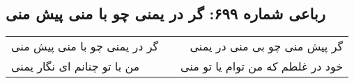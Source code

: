 \begin{center}
\section*{رباعی شماره ۶۹۹: گر در یمنی چو با منی پیش منی}
\label{sec:sh699}
\begin{longtable}{l p{0.5cm} r}
گر در یمنی چو با منی پیش منی
&&
گر پیش منی چو بی منی در یمنی
\\
من با تو چنانم ای نگار یمنی
&&
خود در غلطم که من توام یا تو منی
\\
\end{longtable}
\end{center}
